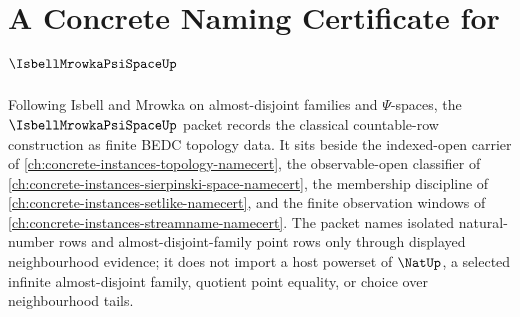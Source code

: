 \chapter{A Concrete Naming Certificate for $\IsbellMrowkaPsiSpaceUp$}
\label{ch:concrete-instances-isbell-mrowka-psi-space-namecert}

Following Isbell and Mrowka on almost-disjoint families and $\Psi$-spaces, the $\IsbellMrowkaPsiSpaceUp$ packet records the classical countable-row construction as finite BEDC topology data. It sits beside the indexed-open carrier of \autoref{ch:concrete-instances-topology-namecert}, the observable-open classifier of \autoref{ch:concrete-instances-sierpinski-space-namecert}, the membership discipline of \autoref{ch:concrete-instances-setlike-namecert}, and the finite observation windows of \autoref{ch:concrete-instances-streamname-namecert}. The packet names isolated natural-number rows and almost-disjoint-family point rows only through displayed neighbourhood evidence; it does not import a host powerset of $\NatUp$, a selected infinite almost-disjoint family, quotient point equality, or choice over neighbourhood tails.


